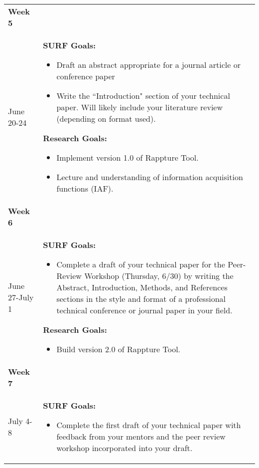 \documentclass[a4paper]{journal}
\begin{document}
\begin{longtable}{| m{} | p{}|}
  \hline
  \textbf{Week 5} & \\ June 20-24 &  \textbf{SURF Goals:}
                                    \begin{itemize}
                                      \item Draft an abstract appropriate for a journal article or conference paper
                                      \item Write the ``Introduction" section of your technical paper. Will likely include your literature review (depending on format used).
                                    \end{itemize}
                                    \textbf{Research Goals:}
                                    \begin{itemize}
                                      \item Implement version 1.0 of Rappture Tool.
                                      \item Lecture and understanding of information acquisition functions (IAF).
                                    \end{itemize}\\
  \hline
  \textbf{Week 6} & \\ June 27-July 1 &  \textbf{SURF Goals:}
                                    \begin{itemize}
                                      \item Complete a draft of your technical paper for the Peer-Review Workshop (Thursday, 6/30) by writing the Abstract, Introduction, Methods, and References sections in the style and format of a professional technical conference or journal paper in your field.
                                    \end{itemize}
                                    \textbf{Research Goals:}
                                    \begin{itemize}
                                      \item Build version 2.0 of Rappture Tool.
                                    \end{itemize}\\
  \hline
  \textbf{Week 7} & \\ July 4-8 &  \textbf{SURF Goals:}
                                    \begin{itemize}
                                      \item Complete the first draft of your technical paper with feedback from your mentors and the peer review workshop incorporated into your draft.

\end{itemize}
\end{longtable}
\end{document}
